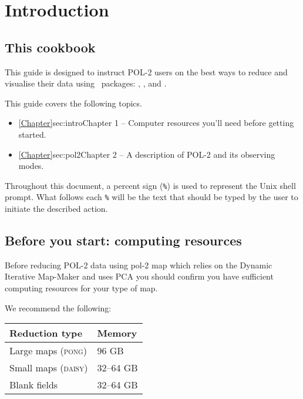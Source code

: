 \chapter{Introduction}
\label{sec:intro}

\renewcommand{\thepage}{\arabic{page}}
\setcounter{page}{1}

\section{This cookbook}

This guide is designed to instruct POL-2 users on the best ways to
reduce and visualise their data using \starlink\ packages:
\smurf \cite{smurf}, \Kappa \cite{kappa}, and \gaia \cite{gaia}.

This guide covers the following topics.
\begin{itemize}
\itemsep0em
\item \cref{Chapter}{sec:intro}{Chapter 1} -- Computer resources you'll need before getting started.
\item \cref{Chapter}{sec:pol2}{Chapter 2} -- A description of POL-2 and its observing modes.


\end{itemize}

Throughout this document, a percent sign (\texttt{\%}) is used to
represent the Unix shell prompt. What follows each \texttt{\%} will be
the text that should be typed by the user to initiate the described action.

\section{ Before you start: computing resources}
\label{sec:computing}

Before reducing POL-2 data using pol-2 map which relies on the Dynamic 
Iterative Map-Maker and uses PCA you should confirm you have
sufficient computing resources for your type of map.

We recommend the following:
\begin{table}[h!]
  \centering
  \begin{tabular}{ll}
    \hline
    \textbf{Reduction type} &\textbf{Memory} \\
    \hline
    Large maps (\textsc{pong})& 96 GB\\
    Small maps (\textsc{daisy})&32--64 GB\\
    Blank fields&32--64 GB\\
    \hline
  \end{tabular}
\end{table}

